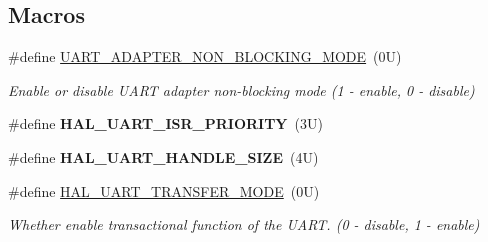 \subsection*{Macros}
\begin{DoxyCompactItemize}
\item 
\mbox{\label{group___u_a_r_t___adapter_ga1e416e28a4597d2c7bb899dd77f03035}} 
\#define \mbox{\hyperlink{group___u_a_r_t___adapter_ga1e416e28a4597d2c7bb899dd77f03035}{U\+A\+R\+T\+\_\+\+A\+D\+A\+P\+T\+E\+R\+\_\+\+N\+O\+N\+\_\+\+B\+L\+O\+C\+K\+I\+N\+G\+\_\+\+M\+O\+DE}}~(0\+U)
\begin{DoxyCompactList}\small\item\em Enable or disable U\+A\+RT adapter non-\/blocking mode (1 -\/ enable, 0 -\/ disable) \end{DoxyCompactList}\item 
\mbox{\label{group___u_a_r_t___adapter_ga4f2e5a5ca7e360e66a3d03c6f0d57d7b}} 
\#define {\bfseries H\+A\+L\+\_\+\+U\+A\+R\+T\+\_\+\+I\+S\+R\+\_\+\+P\+R\+I\+O\+R\+I\+TY}~(3\+U)
\item 
\mbox{\label{group___u_a_r_t___adapter_gaf29d1da1f03c0e201cc643164d6cebd2}} 
\#define {\bfseries H\+A\+L\+\_\+\+U\+A\+R\+T\+\_\+\+H\+A\+N\+D\+L\+E\+\_\+\+S\+I\+ZE}~(4\+U)
\item 
\mbox{\label{group___u_a_r_t___adapter_ga16a70d80d91c156451608862bb0f3d69}} 
\#define \mbox{\hyperlink{group___u_a_r_t___adapter_ga16a70d80d91c156451608862bb0f3d69}{H\+A\+L\+\_\+\+U\+A\+R\+T\+\_\+\+T\+R\+A\+N\+S\+F\+E\+R\+\_\+\+M\+O\+DE}}~(0\+U)
\begin{DoxyCompactList}\small\item\em Whether enable transactional function of the U\+A\+RT. (0 -\/ disable, 1 -\/ enable) \end{DoxyCompactList}\end{DoxyCompactItemize}
